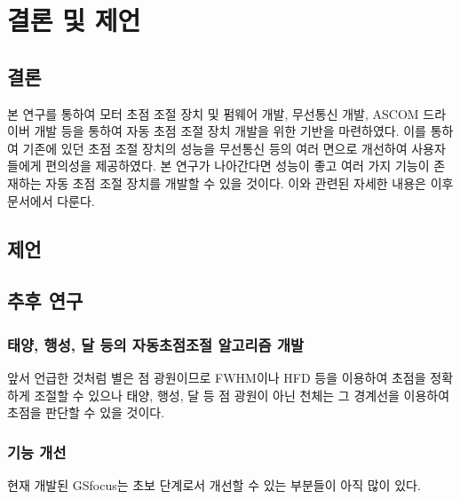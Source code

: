 \section{결론 및 제언}
	
\subsection{결론}

 본 연구를 통하여 모터 초점 조절 장치 및 펌웨어 개발, 무선통신 개발, ASCOM 드라이버 개발 등을 통하여 자동 초점 조절 장치 개발을 위한 기반을 마련하였다. 이를 통하여 기존에 있던 초점 조절 장치의 성능을 무선통신 등의 여러 면으로 개선하여 사용자들에게 편의성을 제공하였다. 본 연구가 나아간다면 성능이 좋고 여러 가지 기능이 존재하는 자동 초점 조절 장치를 개발할 수 있을 것이다. 이와 관련된 자세한 내용은 이후 문서에서 다룬다.


\subsection{제언}



\subsection{추후 연구}


\subsubsection{태양, 행성, 달 등의 자동초점조절 알고리즘 개발}

앞서 언급한 것처럼 별은 점 광원이므로 FWHM이나 HFD 등을 이용하여 초점을 정확하게 조절할 수 있으나 태양, 행성, 달 등 점 광원이 아닌 천체는 그 경계선을 이용하여 초점을 판단할 수 있을 것이다. 


\subsubsection{기능 개선}

현재 개발된 GSfocus는 초보 단계로서 개선할 수 있는 부분들이 아직 많이 있다. 


